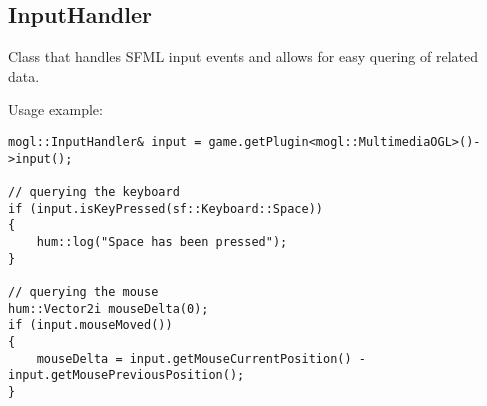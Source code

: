 \subsection{InputHandler}
Class that handles SFML input events and allows for easy quering of
related data.

Usage example:
\begin{lstlisting}[caption=InputHandler example]
mogl::InputHandler& input = game.getPlugin<mogl::MultimediaOGL>()->input();

// querying the keyboard
if (input.isKeyPressed(sf::Keyboard::Space))
{
    hum::log("Space has been pressed");
}

// querying the mouse
hum::Vector2i mouseDelta(0);
if (input.mouseMoved())
{
    mouseDelta = input.getMouseCurrentPosition() - input.getMousePreviousPosition();
}
\end{lstlisting}
